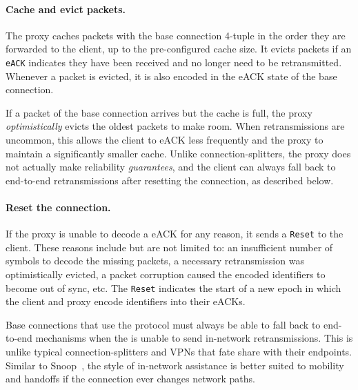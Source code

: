 \paragraph{Cache and evict packets.}

The proxy caches packets with the base connection 4-tuple in the order they are
forwarded to the client, up to the pre-configured cache size. It evicts packets
if an \texttt{eACK} indicates they have been received and no longer need to be
retransmitted. Whenever a packet is evicted, it is also encoded in the eACK
state of the base connection.

If a packet of the base connection arrives but the cache is full, the
proxy \textit{optimistically} evicts the oldest packets to make room. When
retransmissions are uncommon, this allows the client to eACK less frequently
and the proxy to maintain a significantly smaller cache. Unlike
connection-splitters, the proxy does not actually make reliability \textit
{guarantees}, and the client can always fall back to end-to-end retransmissions
after resetting the \sys connection, as described below.

\paragraph{Reset the \sys connection.}

If the proxy is unable to decode a eACK for any reason, it sends a \texttt
{Reset} to the client. These reasons include but are not limited to: an
insufficient number of symbols to decode the missing packets, a necessary
retransmission was optimistically evicted,
a packet corruption caused the encoded identifiers
to become out of sync, etc. The \texttt{Reset} indicates the start of a new
epoch in which the client and proxy encode identifiers into their eACKs.

Base connections that use the \Sys protocol must always be able to fall back to
end-to-end mechanisms when the \Sys is unable to send in-network
retransmissions. This is unlike typical connection-splitters and VPNs that fate
share with their endpoints. Similar to Snoop~\cite{balakrishnan1995snoop},
the \Sys style of in-network
assistance is better suited to mobility and handoffs if the connection ever
changes network paths.


